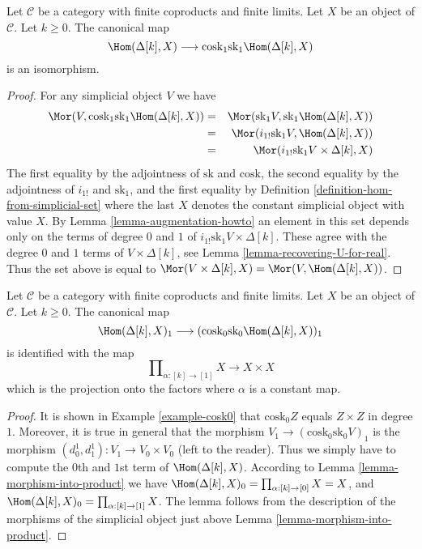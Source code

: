 \begin{lemma}
\label{lemma-cosk-hom-deltak}
Let $\mathcal{C}$ be a category with finite coproducts
and finite limits. Let $X$ be an object of $\mathcal{C}$.
Let $k \geq 0$. The canonical map
$$
\Hom(\Delta[k], X)
\longrightarrow
\text{cosk}_1 \text{sk}_1 \Hom(\Delta[k], X)
$$
is an isomorphism.
\end{lemma}

\begin{proof}
For any simplicial object $V$ we have
\begin{eqnarray*}
\Mor(V, \text{cosk}_1 \text{sk}_1 \Hom(\Delta[k], X))
& = &
\Mor(\text{sk}_1 V, \text{sk}_1 \Hom(\Delta[k], X)) \\
& = &
\Mor(i_{1!} \text{sk}_1 V, \Hom(\Delta[k], X)) \\
& = &
\Mor(i_{1!} \text{sk}_1 V \times \Delta[k], X)
\end{eqnarray*}
The first equality by the adjointness of $\text{sk}$ and $\text{cosk}$,
the second equality by the adjointness of $i_{1!}$ and $\text{sk}_1$, and
the first equality by Definition \ref{definition-hom-from-simplicial-set}
where the last $X$ denotes the constant simplicial object with value $X$.
By Lemma \ref{lemma-augmentation-howto} an element
in this set depends only on the terms of degree $0$ and $1$
of $i_{1!} \text{sk}_1 V \times \Delta[k]$. These
agree with the degree $0$ and $1$ terms of
$V \times \Delta[k]$, see Lemma \ref{lemma-recovering-U-for-real}.
Thus the set above is equal to
$\Mor(V \times \Delta[k], X) = \Mor(V, \Hom(\Delta[k], X))$.
\end{proof}

\begin{lemma}
\label{lemma-cosk0-hom-deltak}
Let $\mathcal{C}$ be a category with finite coproducts
and finite limits. Let $X$ be an object of $\mathcal{C}$.
Let $k \geq 0$. The canonical map
$$
\Hom(\Delta[k], X)_1
\longrightarrow
(\text{cosk}_0 \text{sk}_0 \Hom(\Delta[k], X))_1
$$
is identified with the map
$$
\prod\nolimits_{\alpha : [k] \to [1]} X
\longrightarrow
X \times X
$$
which is the projection onto the factors where $\alpha$
is a constant map.
\end{lemma}

\begin{proof}
It is shown in Example \ref{example-cosk0} that
$\text{cosk}_0 Z$ equals $Z \times Z$ in degree $1$.
Moreover, it is true in general that the morphism
$V_1 \to (\text{cosk}_0 \text{sk}_0 V)_1$ is
the morphism $(d^1_0, d^1_1) : V_1 \to V_0 \times V_0$
(left to the reader). Thus we simply have to compute
the $0$th and $1$st term of $\Hom(\Delta[k], X)$.
According to Lemma \ref{lemma-morphism-into-product}
we have
$\Hom(\Delta[k], X)_0 = \prod_{\alpha : [k] \to [0]} X = X$,
and $\Hom(\Delta[k], X)_0 = \prod_{\alpha : [k] \to [1]} X$.
The lemma follows from the description of the
morphisms of the simplicial object just above
Lemma \ref{lemma-morphism-into-product}.
\end{proof}




